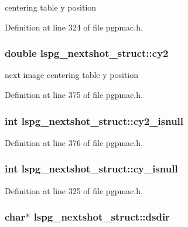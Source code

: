 centering table y position 



Definition at line 324 of file pgpmac.\-h.

\hypertarget{structlspg__nextshot__struct_a3644e5c3f12af18a3b426d4d4d7e16a5}{
\subsubsection[{cy2}]{\setlength{\rightskip}{0pt plus 5cm}double lspg\-\_\-nextshot\-\_\-struct\-::cy2}}\label{structlspg__nextshot__struct_a3644e5c3f12af18a3b426d4d4d7e16a5}


next image centering table y position 



Definition at line 375 of file pgpmac.\-h.

\hypertarget{structlspg__nextshot__struct_a57d78a389413827302df6ebe3dcb3c89}{
\subsubsection[{cy2\-\_\-isnull}]{\setlength{\rightskip}{0pt plus 5cm}int lspg\-\_\-nextshot\-\_\-struct\-::cy2\-\_\-isnull}}\label{structlspg__nextshot__struct_a57d78a389413827302df6ebe3dcb3c89}


Definition at line 376 of file pgpmac.\-h.

\hypertarget{structlspg__nextshot__struct_a3895d645420848aed05b95694ec8c6c7}{
\subsubsection[{cy\-\_\-isnull}]{\setlength{\rightskip}{0pt plus 5cm}int lspg\-\_\-nextshot\-\_\-struct\-::cy\-\_\-isnull}}\label{structlspg__nextshot__struct_a3895d645420848aed05b95694ec8c6c7}


Definition at line 325 of file pgpmac.\-h.

\hypertarget{structlspg__nextshot__struct_ac372e1774a25b3d4bfbb9169762eb39e}{
\subsubsection[{dsdir}]{\setlength{\rightskip}{0pt plus 5cm}char$\ast$ lspg\-\_\-nextshot\-\_\-struct\-::dsdir}}\label{structlspg__nextshot__struct_ac372e1774a25b3d4bfbb9169762eb39e}



